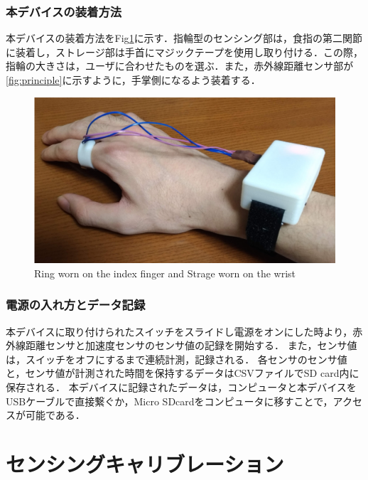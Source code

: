 \subsubsection*{本デバイスの装着方法}
本デバイスの装着方法をFig\ref{fig:ring}に示す．指輪型のセンシング部は，食指の第二関節に装着し，ストレージ部は手首にマジックテープを使用し取り付ける．この際，指輪の大きさは，ユーザに合わせたものを選ぶ．また，赤外線距離センサ部が\ref{fig:principle}に示すように，手掌側になるよう装着する．
\begin{figure}[H]
  \centering
  \includegraphics[width=0.8\linewidth]{fig/fal4.png}
  \caption{Ring worn on the index finger and Strage worn on the wrist}
  \label{fig:ring}
\end{figure}

\subsubsection*{電源の入れ方とデータ記録}
本デバイスに取り付けられたスイッチをスライドし電源をオンにした時より，赤外線距離センサと加速度センサのセンサ値の記録を開始する．
また，センサ値は，スイッチをオフにするまで連続計測，記録される．
各センサのセンサ値と，センサ値が計測された時間を保持するデータはCSVファイルでSD card内に保存される．
本デバイスに記録されたデータは，コンピュータと本デバイスをUSBケーブルで直接繋ぐか，Micro SDcardをコンピュータに移すことで，アクセスが可能である．



\section{センシングキャリブレーション}
